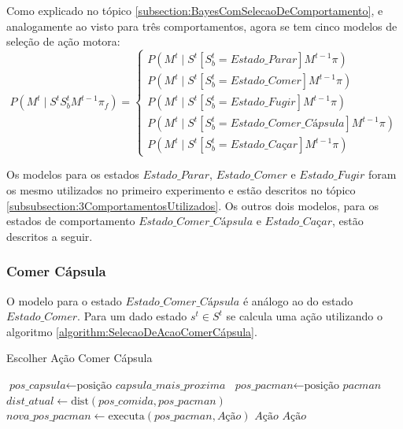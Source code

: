 Como explicado no tópico \ref{subsection:BayesComSelecaoDeComportamento}, e analogamente ao visto para três comportamentos, agora se tem cinco modelos de seleção de ação motora:
\begin{equation}
    P \left( M^t \mid S^t S_b^t M^{t-1} \pi_f \right) = 
        \left\{
            \begin{array}{l}
                P \left( M^t \mid S^t \left[ S_b^t=Estado\_Parar \right] M^{t-1} \pi \right) \\
                P \left( M^t \mid S^t \left[ S_b^t=Estado\_Comer \right] M^{t-1} \pi \right) \\
                P \left( M^t \mid S^t \left[ S_b^t=Estado\_Fugir \right] M^{t-1} \pi \right) \\
                P \left( M^t \mid S^t \left[ S_b^t=\textit{Estado\_Comer\_Cápsula} \right] M^{t-1} \pi \right) \\
                P \left( M^t \mid S^t \left[ S_b^t=\textit{Estado\_Caçar} \right] M^{t-1} \pi \right)
            \end{array}
        \right.
\end{equation}

Os modelos para os estados $ Estado\_Parar $, $ Estado\_Comer $ e $ Estado\_Fugir $ foram os mesmo utilizados no primeiro experimento e estão descritos no tópico \ref{subsubsection:3ComportamentosUtilizados}. Os outros dois modelos, para os estados de comportamento $ \textit{Estado\_Comer\_Cápsula} $ e $ \textit{Estado\_Caçar} $, estão descritos a seguir.

\subsubsection*{Comer Cápsula}

O modelo para o estado $ \textit{Estado\_Comer\_Cápsula} $ é análogo ao do estado $ Estado\_Comer $. Para um dado estado $ s^t \in S^t $ se calcula uma ação utilizando o algoritmo \ref{algorithm:SelecaoDeAcaoComerCápsula}.

\begin{algorithm}[H]
	\caption{Escolher Ação Comer Cápsula} \label{algorithm:SelecaoDeAcaoComerCápsula}
	\begin{algorithmic}[1]
			\State $\textit{pos\_capsula} \gets \text{posição }\textit{capsula\_mais\_proxima} $
			\State $\textit{pos\_pacman} \gets \text{posição }\textit{pacman} $
			\State $\textit{dist\_atual} \gets \text{dist} \left( \textit{pos\_comida}, \textit{pos\_pacman} \right) $
				\State $\textit{nova\_pos\_pacman} \gets \text{executa} \left( \textit{pos\_pacman}, \textit{Ação} \right) $
					\State \Return $ \textit{Ação} $
				\EndIf 
			\EndFor
			\State \Return $ \textit{Ação} $
		\EndProcedure
	\end{algorithmic}
\end{algorithm}

